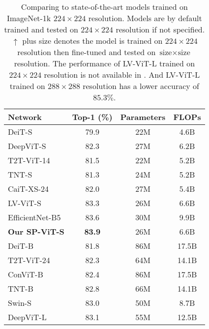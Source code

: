 \documentclass[authorversion, sigconf, acmthm=false, nonacm=true]{acmart}
\begin{document}
 \begin{table}[h]
         \caption{Comparing to state-of-the-art models trained on ImageNet-1k $224\times224$ resolution.  
        Models are by default trained and tested on $224\times224$ resolution if not specified. 
        $\uparrow$ plus size denotes the model is trained on $224\times224$ resolution then fine-tuned and tested on $\text{size}\times\text{size}$ resolution. The performance of LV-ViT-L trained on $224\times224$ resolution is not available in \cite{jiang2021all}. And  LV-ViT-L trained on $288\times288$ resolution has a lower accuracy of $85.3\%$.}
        \centering
\begin{tabular}{lccc}
           \toprule
            Network     & Top-1 (\%) &  Parameters & FLOPs \\
            \midrule
           DeiT-S \cite{touvron2021training} & 79.9 &  22M& 4.6B\\
     
            DeepViT-S \cite{zhou2021deepvit} & 82.3 & 27M & 6.2B\\
      
           T2T-ViT-14 \cite{yuan2021tokens} & 81.5 & 22M & 5.2B \\
      
           TNT-S \cite{han2021transformer} & 81.3 & 24M & 5.2B \\
           CaiT-XS-24 \cite{touvron2021going} & 82.0 & 27M & 5.4B \\
            LV-ViT-S \cite{jiang2021all} &83.3& 26M & 6.6B \\ 
            EfficientNet-B5 \cite{tan2019efficientnet} & 83.6 & 30M & 9.9B\\
             \textbf{Our SP-ViT-S} &\textbf{83.9}&  26M& 6.6B \\ 
           \midrule
         
            DeiT-B  \cite{touvron2021training} & 81.8  & 86M& 17.5B   \\
            T2T-ViT-24 \cite{yuan2021tokens} & 82.3 & 64M & 14.1B \\
        ConViT-B \cite{d'ascoli2021convit}& 82.4 & 86M & 17.5B \\
         TNT-B \cite{yuan2021tokens} & 82.8 & 66M & 14.1B \\
          
         Swin-S \cite{liu2021swin} & 83.0 & 50M & 8.7B \\
        
           DeepViT-L \cite{zhou2021deepvit} & 83.1 & 55M &12.5B \\
            

\end{tabular}
\end{table}
\end{document}
